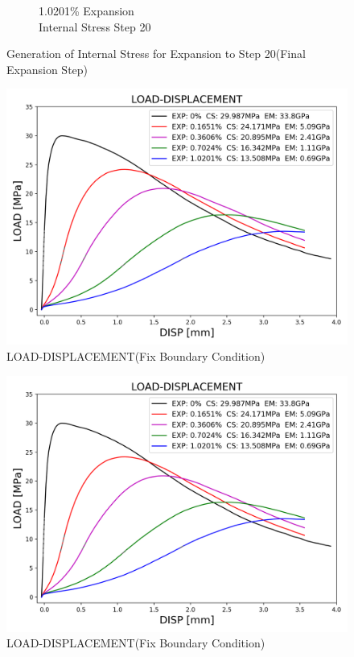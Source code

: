 \begin{figure}[ht!]
\begin{subfigure}{.25\textwidth}
      \caption{1.0201\% Expansion\\Internal Stress Step 20}
    \end{subfigure}

\caption{Generation of Internal Stress for Expansion to Step 20(Final Expansion Step)}
\label{fig:A30P25_stress}
\end{figure}

\begin{figure}[ht!]
    \centering
    \includegraphics[width=0.8\linewidth]{Files/exp_3D/ASR/S13A30P25FIX-LOAD-DISPLACEMENT.png}
    \caption{LOAD-DISPLACEMENT(Fix Boundary Condition)}
    \label{fig:S13A30P25FIX-LOAD-DISPLACEMENT}
\end{figure}


\begin{figure}[ht!]
    \centering
    \includegraphics[width=0.8\linewidth]{Files/exp_3D/ASR/S13A30P25FIX-LOAD-DISPLACEMENT.png}
    \caption{LOAD-DISPLACEMENT(Fix Boundary Condition)}
    \label{fig:S13A30P25FIX-LOAD-DISPLACEMENT}
\end{figure}

